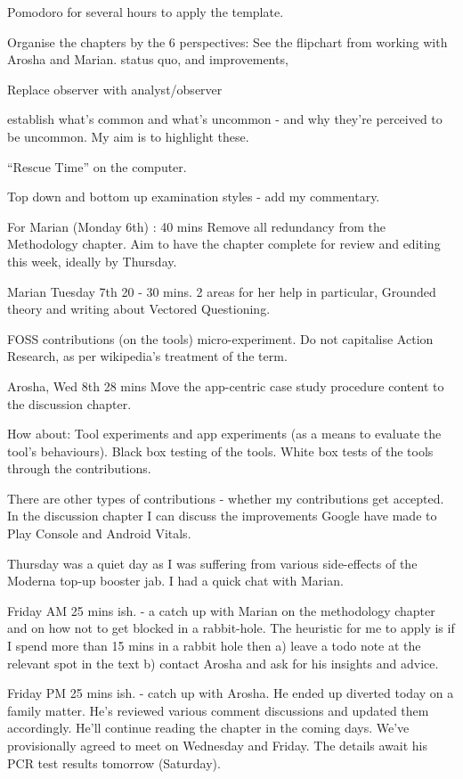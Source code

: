 Pomodoro for several hours to apply the template. 

Organise the chapters by the 6 perspectives: See the flipchart from working with Arosha and Marian.
status quo, and improvements,

Replace observer with analyst/observer

establish what’s common and what’s uncommon - and why they’re perceived to be uncommon. My aim is to highlight these. 

“Rescue Time” on the computer.

Top down and bottom up examination styles - add my commentary.

For Marian (Monday 6th) : 40 mins
Remove all redundancy from the Methodology chapter. Aim to have the chapter complete for review and editing this week, ideally by Thursday.

Marian Tuesday 7th  20 - 30 mins. 
2 areas for her help in particular, Grounded theory and writing about Vectored Questioning.

FOSS contributions (on the tools) micro-experiment.
Do not capitalise Action Research, as per wikipedia’s treatment of the term.


Arosha, Wed 8th 28 mins
Move the app-centric case study procedure content to the discussion chapter.

How about: Tool experiments and app experiments (as a means to evaluate the tool’s behaviours). Black box testing of the tools. White box tests of the tools through the contributions. 

There are other types of contributions - whether my contributions get accepted. In the discussion chapter I can discuss the improvements Google have made to Play Console and Android Vitals.


Thursday was a quiet day as I was suffering from various side-effects of the Moderna top-up booster jab. I had a quick chat with Marian.

Friday AM  25 mins ish. - a catch up with Marian on the methodology chapter and on how not to get blocked in a rabbit-hole. The heuristic for me to apply is if I spend more than 15 mins in a rabbit hole then a) leave a todo note at the relevant spot in the text b) contact Arosha and ask for his insights and advice.

Friday PM 25 mins ish. - catch up with Arosha. He ended up diverted today on a family matter. He’s reviewed various comment discussions and updated them accordingly. He’ll continue reading the chapter in the coming days. We’ve provisionally agreed to meet on Wednesday and Friday. The details await his PCR test results tomorrow (Saturday).

